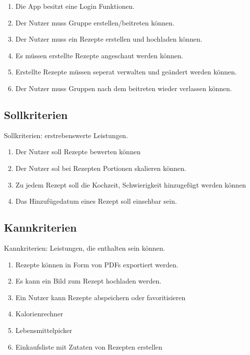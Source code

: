 \documentclass[parskip=full]{scrartcl}
\begin{document}
\begin{enumerate}[start=1,label={$\langle$\bfseries RM\arabic*$\rangle$}, leftmargin = 5em, itemsep=4pt, parsep=4pt]
    \item Die App besitzt eine Login Funktionen.
    \item Der Nutzer muss Gruppe erstellen/beitreten können.
    \item Der Nutzer muss ein Rezepte erstellen und hochladen können.
    \item Es müssen erstellte Rezepte angeschaut werden können.
    \item Erstellte Rezepte müssen seperat verwalten und geändert werden können.
    \item Der Nutzer muss Gruppen nach dem beitreten wieder verlassen können.
\end{enumerate}

\subsection{Sollkriterien}
Sollkriterien: erstrebenswerte Leistungen.

\begin{enumerate}[start=1,label={$\langle$\bfseries RS\arabic*$\rangle$}, leftmargin = 5em, itemsep=4pt, parsep=4pt]
    \item Der Nutzer soll Rezepte bewerten können
    \item Der Nutzer sol bei Rezepten Portionen skalieren können.
    \item Zu jedem Rezept soll die Kochzeit, Schwierigkeit hinzugefügt werden können
    \item Das Hinzufügedatum eines Rezept soll einsehbar sein.
\end{enumerate}

\subsection{Kannkriterien}
Kannkriterien: Leistungen, die enthalten sein können.

\begin{enumerate}[start=1,label={$\langle$\bfseries RC\arabic*$\rangle$}, leftmargin = 5em, itemsep=4pt, parsep=4pt]
    \item Rezepte können in Form von PDFs exportiert werden.
    \item Es kann ein Bild zum Rezept hochladen werden.
    \item Ein Nutzer kann Rezepte abspeichern oder favoritisieren
    \item Kalorienrechner
    \item Lebensmittelpicker
    \item Einkaufsliste mit Zutaten von Rezepten erstellen
\end{enumerate}
\end{document}
